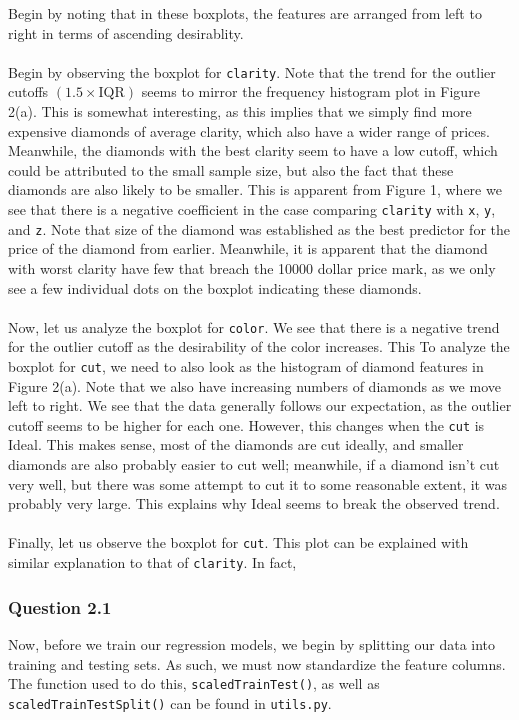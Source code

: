 \documentclass[11pt,letterpaper]{article}
\begin{document}
Begin by noting that in these boxplots, the features are arranged from left to right
in terms of ascending desirablity. \\\\
Begin by observing the boxplot for \texttt{clarity}. Note that the trend for the outlier cutoffs
$(1.5\times \text{IQR})$ seems to mirror the frequency histogram plot in Figure 2(a). This
is somewhat interesting, as this implies that we simply find more expensive diamonds 
of average clarity, which also have a wider range of prices. Meanwhile, the 
diamonds with the best clarity seem to have a low cutoff, which could be attributed to
the small sample size, but also the fact that these diamonds are also likely to be smaller. 
This is apparent from Figure 1, where we see that there is a negative coefficient in the case
comparing \texttt{clarity} with \texttt{x}, \texttt{y}, and \texttt{z}.
Note that size of the diamond was established as the best predictor for the price of the diamond 
from earlier. Meanwhile, it is apparent that the diamond with worst clarity have few that
breach the 10000 dollar price mark, as we only see a few individual dots on the boxplot indicating
these diamonds. \\\\
Now, let us analyze the boxplot for \texttt{color}. We see that there is a negative trend 
for the outlier cutoff as the desirability of the color increases. This 
To analyze the boxplot for \texttt{cut}, we need to also look as the histogram 
of diamond features in Figure 2(a). Note that we also have increasing numbers of 
diamonds as we move left to right. We see that the data generally follows our expectation,
as the outlier cutoff seems to be higher for each one. However, 
this changes when the \texttt{cut} is Ideal. This makes sense, most of the diamonds are
cut ideally, and smaller diamonds are also probably easier to cut well; meanwhile, 
if a diamond isn't cut very well, but there was some attempt to cut it to some reasonable
extent, it was probably very large. This explains why Ideal seems to break the 
observed trend. \\\\
Finally, let us observe the boxplot for \texttt{cut}. This plot can be explained with 
similar explanation to that of \texttt{clarity}. In fact, 


\subsubsection*{Question 2.1}
Now, before we train our regression models, we begin by splitting our data into 
training and testing sets. As such, we must now standardize the feature columns.
The function used to do this, \texttt{scaledTrainTest()}, as well as \texttt{
scaledTrainTestSplit()} can be found in \texttt{utils.py}.
\end{document}
